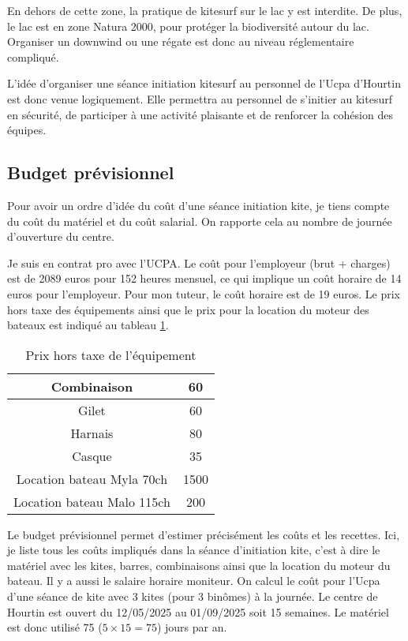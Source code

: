 \documentclass[11pt,a4paper]{report}
\begin{document}
En dehors de cette zone, la pratique de kitesurf sur le lac
y est interdite. De plus, le lac est en zone Natura 2000\cite{natura2000}, pour
protéger la biodiversité autour du lac.
Organiser un downwind ou une régate est donc au niveau
réglementaire compliqué. 

L'idée d'organiser une séance initiation kitesurf
au personnel de l'Ucpa d'Hourtin est donc venue logiquement.
Elle permettra au personnel de s'initier au kitesurf en 
sécurité, de participer à une activité plaisante
et de renforcer la cohésion des équipes.

\subsection{Budget prévisionnel}

Pour avoir un ordre d'idée du coût d'une séance initiation kite, je
tiens compte du co\^ut du matériel et du co\^ut salarial. On rapporte 
cela au nombre de journée d'ouverture du centre.

Je suis en contrat pro avec l'UCPA. Le coût pour l'employeur (brut + charges) est
de 2089 euros pour 152 heures mensuel, 
ce qui implique un coût horaire de 14 euros pour l'employeur.
Pour mon tuteur, le coût horaire est de 19 euros.
Le prix hors taxe des équipements ainsi
que le prix pour la location du moteur des bateaux est indiqué
au tableau \ref{cout_equipement}.



\begin{table}
\begin{centering}
\begin{tabular}{|c|c|}
\hline
Combinaison & 60 \\
\hline
Gilet   & 60   \\
Harnais  & 80 \\
\hline
Casque     & 35 \\
\hline
Location bateau Myla 70ch  &  1500 \\
\hline 
Location bateau Malo 115ch & 200 \\
\hline
\end{tabular}
\caption{Prix hors taxe de l'équipement\label{cout_equipement}}
\end{centering}
\end{table}
Le budget prévisionnel permet d'estimer précisément les co\^uts et les recettes.
Ici, je liste tous les coûts impliqués dans la séance d’initiation kite, 
c'est  à dire le matériel avec les kites, barres, combinaisons ainsi que
la location du moteur du bateau. Il y a aussi le salaire horaire moniteur. 
On calcul le coût pour l'Ucpa
d'une séance de kite avec 3 kites (pour 3 binômes) à la journée.
Le centre de Hourtin est ouvert du 12/05/2025 au 01/09/2025 soit 15 semaines.
Le matériel est donc utilisé 75 ($5\times15=75$) jours par an.
\end{document}
